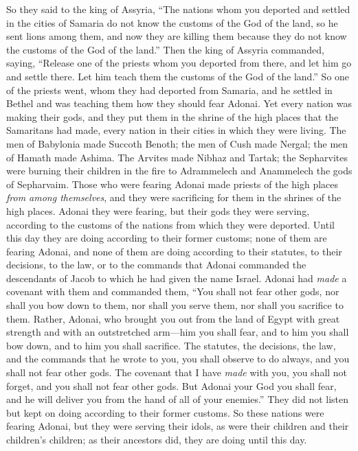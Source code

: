 \begin{biblechapter}
\verse So they said to the king of Assyria, “The nations whom you deported and settled in the cities of Samaria do not know the customs of the God of the land, so he sent lions among them, and now they are killing them because they do not know the customs of the God of the land.”
\verse Then the king of Assyria commanded, saying, “Release one of the priests whom you deported from there, and let him go and settle there. Let him teach them the customs of the God of the land.”
\verse So one of the priests went, whom they had deported from Samaria, and he settled in Bethel and was teaching them how they should fear Adonai.
\verse Yet every nation was making their gods, and they put them in the shrine of the high places that the Samaritans had made, every nation in their cities in which they were living.
\verse The men of Babylonia made Succoth Benoth; the men of Cush made Nergal; the men of Hamath made Ashima.
\verse The Arvites made Nibhaz and Tartak; the Sepharvites were burning their children in the fire to Adrammelech and Anammelech the gods of Sepharvaim.
\verse Those who were fearing Adonai made priests of the high places \textit{from among themselves}, and they were sacrificing for them in the shrines of the high places.
\verse Adonai they were fearing, but their gods they were serving, according to the customs of the nations from which they were deported.
\verse Until this day they are doing according to their former customs; none of them are fearing Adonai, and none of them are doing according to their statutes, to their decisions, to the law, or to the commands that Adonai commanded the descendants of Jacob to which he had given the name Israel.
\verse Adonai had \textit{made} a covenant with them and commanded them, “You shall not fear other gods, nor shall you bow down to them, nor shall you serve them, nor shall you sacrifice to them.
\verse Rather, Adonai, who brought you out from the land of Egypt with great strength and with an outstretched arm—him you shall fear, and to him you shall bow down, and to him you shall sacrifice.
\verse The statutes, the decisions, the law, and the commands that he wrote to you, you shall observe to do always, and you shall not fear other gods.
\verse The covenant that I have \textit{made} with you, you shall not forget, and you shall not fear other gods.
\verse But Adonai your God you shall fear, and he will deliver you from the hand of all of your enemies.”
\verse They did not listen but kept on doing according to their former customs.
\verse So these nations were fearing Adonai, but they were serving their idols, as were their children and their children’s children; as their ancestors did, they are doing until this day.
\end{biblechapter}

